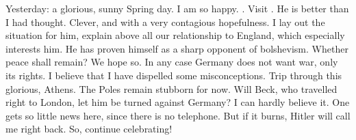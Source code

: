 Yesterday: a glorious, sunny  Spring day. I am so happy. \missing. Visit . He is better than I had thought. Clever, and with a very contagious hopefulness. I lay out the situation for him, explain above all our relationship to England, which especially interests him. He has proven himself as a sharp opponent of bolshevism. Whether peace shall remain? We hope so. In any case Germany does not want war, only its rights. I believe that I have dispelled some misconceptions. Trip through this glorious,  Athens. \missing The Poles remain stubborn for now. Will Beck, who travelled right to London, let him be turned against Germany? I can hardly believe it. One gets so little news here, since there is no telephone. But if it burns, Hitler will call me right back. So, continue celebrating!